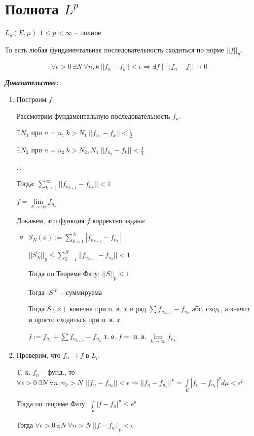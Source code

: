 \documentclass[paper=a4, fontsize=17pt]{article}
\begin{document}
\section{Полнота $L^p$}
$ L_p(E, \mu) ~ ~ 1 \leq p < \infty $ -- полное 

То есть любая фундаментальная последовательность сходиться по норме $ ||f||_p $.

$$ \forall \epsilon > 0 ~ \exists N ~ \forall n, k ~ ||f_n - f_k|| < \epsilon \Rightarrow \exists f \mid ~ ||f_n - f|| \rightarrow 0 $$


\textbf{\emph{Доказательство:}}

\begin{enumerate}
	\item Построим $ f $.
	
	Рассмотрим фундаментальную последовательность $ f_n $.
	
	$ \exists N_1 $ при $ n = n_1 ~ k > N_1 ~ ||f_{n_1} - f_k|| < \frac{1}{2}$
	
	$ \exists N_2 $ при $ n = n_2 ~ k > N_2, N_1 ~ ||f_{n_2} - f_k|| < \frac{1}{4}$
	
	\dots
	
	Тогда: $ \sum_{k = 1}^{\infty} || f_{n_{k+1}} - f_{n_k} || < 1$
	
	$ f = \lim\limits_{k \rightarrow \infty} f_{n_k}$
	 
	Докажем, это функция $ f $ корректно задана: 
	\begin{itemize}
		\item 
		$ S_N (x) := \sum_{k = 1}^{N}|f_{n_{k+1}} - f_{n_k}|$
		
		$ ||S_N||_p \leq \sum_{k = 1}^{N} || f_{n_{k+1}} - f_{n_k} || < 1$
		
		Тогда по Теореме Фату: $ ||S||_p \leq 1 $
		
		Тогда $ |S|^p $ -- суммируема 
		
		Тогда $ S(x) $ конечна при п. в. $ x $  и ряд $ \sum f_{n_{k + 1}} - f_{n_k} $ абс. сход., а значит  и просто сходиться при п. в. $ x $
		
		$ f:= f_{n_1} +  \sum f_{n_{k + 1}} - f_{n_k} $ т. е. $ f = $ п. в. $ \lim\limits_{k \rightarrow \infty} f_{n_k} $
	\end{itemize}
	
	\item Проверим, что $ f_n \rightarrow f $ в $ L_p $ 
	
	Т. к. $ f_n $ -- фунд., то $ \forall \epsilon > 0 ~ \exists N ~ \forall n, n_k > N ~ ~ ||f_n - f_{n_k} || < \epsilon \Rightarrow 
	|| f_n  - f_{n_k} ||^p  = \int\limits_{E} |f_n  - f_{n_k}|^p d\mu < \epsilon^p $ 

	Тогда по теореме Фату: $ \int\limits_{E} |f - f_n|^p \leq \epsilon^p$
	
	Тогда $ \forall \epsilon > 0 ~ \exists N ~ \forall n > N ~ || f - f_n ||_p < \epsilon $
	
	
\end{enumerate}
\end{document}
